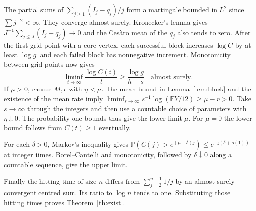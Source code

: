 \documentclass[11pt]{article}
\newcommand{\sectag}[1]{\renewcommand{\thesection}{#1}\renewcommand{\theHsection}{#1}}
\theoremstyle{remark}
\numberwithin{equation}{section}
\newcommand{\E}{\mathbb E}
\newcommand{\Prob}{\mathbb P}
\begin{document}
The partial sums of $\sum_{j\ge1}(I_j-q_j)/j$ form a martingale bounded in $L^2$ since $\sum j^{-2}<\infty$. They converge almost surely. Kronecker's lemma gives $J^{-1}\sum_{j\le J}(I_j-q_j)\to0$ and the Cesàro mean of the $q_j$ also tends to zero. After the first grid point with a core vertex, each successful block increases $\log C$ by at least $\log g$, and each failed block has nonnegative increment. Monotonicity between grid points now gives
\[
 \liminf_{t\to\infty}\frac{\log C(t)}t\ge\frac{\log g}{h+s}
 \quad\text{almost surely}.
\]
If $\mu>0$, choose $M,\epsilon$ with $\eta<\mu$. The mean bound in Lemma~\ref{lem:block} and the existence of the mean rate imply $\liminf_{s\to\infty}s^{-1}\log(\E Y/12)\ge\mu-\eta>0$. Take $s\to\infty$ through the integers and then use a countable choice of parameters with $\eta\downarrow0$. The probability-one bounds thus give the lower limit $\mu$. For $\mu=0$ the lower bound follows from $C(t)\ge1$ eventually.

For each $\delta>0$, Markov's inequality gives $\Prob(C(j)>e^{(\mu+\delta)j})\le e^{-j(\delta+o(1))}$ at integer times. Borel--Cantelli and monotonicity, followed by $\delta\downarrow0$ along a countable sequence, give the upper limit.

Finally the hitting time of size $n$ differs from $\sum_{j=2}^{n-1}1/j$ by an almost surely convergent centred sum. Its ratio to $\log n$ tends to one. Substituting those hitting times proves Theorem~\ref{th:exist}.

\sectag{MOT3}
\end{document}
